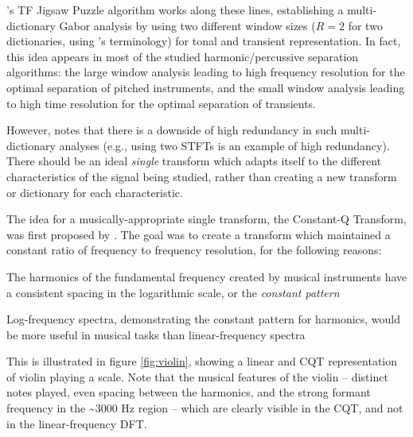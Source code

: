 \documentclass[letter,12pt]{article}
\newenvironment{tight_itemize}{
\begin{itemize}
  \setlength{\itemsep}{0pt}
  \setlength{\parskip}{0pt}
}{\end{itemize}}
\begin{document}
\citet{tfjigsaw}'s TF Jigsaw Puzzle algorithm works along these lines, establishing a multi-dictionary Gabor analysis by using two different window sizes ($R = 2$ for two dictionaries, using \citet{doerflerphd}'s terminology) for tonal and transient representation. In fact, this idea appears in most of the studied harmonic/percussive separation algorithms: the large window analysis leading to high frequency resolution for the optimal separation of pitched instruments, and the small window analysis leading to high time resolution for the optimal separation of transients.

However, \citet{doerflerphd} notes that there is a downside of high redundancy in such multi-dictionary analyses (e.g., using two STFTs is an example of high redundancy). There should be an ideal \textit{single} transform which adapts itself to the different characteristics of the signal being studied, rather than creating a new transform or dictionary for each characteristic.

The idea for a musically-appropriate single transform, the Constant-Q Transform, was first proposed by \citet{jbrown}. The goal was to create a transform which maintained a constant ratio of frequency to frequency resolution, for the following reasons:

\begin{tight_itemize}
	\item
		The harmonics of the fundamental frequency created by musical instruments have a consistent spacing in the logarithmic scale, or the \textit{constant pattern}
	\item
		Log-frequency spectra, demonstrating the constant pattern for harmonics, would be more useful in musical tasks than linear-frequency spectra
\end{tight_itemize}

This is illustrated in figure \ref{fig:violin}, showing a linear and CQT representation of violin playing a scale. Note that the musical features of the violin -- distinct notes played, even spacing between the harmonics, and the strong formant frequency in the \textasciitilde3000 Hz region -- which are clearly visible in the CQT, and not in the linear-frequency DFT.
\end{document}
